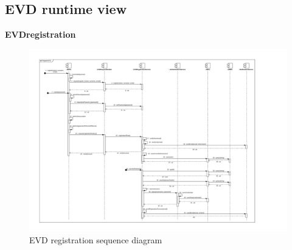 \subsection{EVD runtime view}
\textbf{EVDregistration}\\
\begin{figure}[H]
    \centering
    \includegraphics[trim={1cm 1cm 3cm 1cm},clip, width=1\textwidth]{Images/cp2/runtime/EVDRegistration.pdf}
    \caption{EVD registration sequence diagram}
\end{figure}
